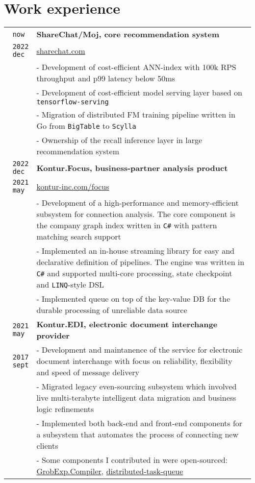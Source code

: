 \documentclass[10pt,a4paper]{article}
\begin{document}
\section{Work experience}
\vspace{1mm}
\begin{tabular}{r p{14cm}}
	\texttt{now{ }} & \textbf{ShareChat/Moj, core recommendation system}\\
	\texttt{2022 dec{ }} & \href{https://sharechat.com/}{sharechat.com}\\
	& \small{- Development of cost-efficient ANN-index with 100k RPS throughput and p99 latency below 50ms}\\
	& \small{- Development of cost-efficient model serving layer based on \texttt{tensorflow-serving}}\\
	& \small{- Migration of distributed FM training pipeline written in Go from \texttt{BigTable} to \texttt{Scylla}}\\
	& \small{- Ownership of the recall inference layer in large recommendation system}\\

	\texttt{2022 dec{ }} & \textbf{Kontur.Focus, business-partner analysis product}\\
	\texttt{2021 may{ }} & \href{https://kontur-inc.com/focus}{kontur-inc.com/focus}\\
	& \small{- Development of a high-performance and memory-efficient subsystem for connection analysis. The core component is the company graph index written in \texttt{C\#} with pattern matching search support}\\
	& \small{- Implemented an in-house streaming library for easy and declarative definition of pipelines. The engine was written in \texttt{C\#} and supported multi-core processing, state checkpoint and \texttt{LINQ}-style DSL}\\
	& \small{- Implemented queue on top of the key-value DB for the durable processing of unreliable data source}\\

    \texttt{2021 may{ }} & \textbf{Kontur.EDI, electronic document interchange provider} \\
    \texttt{2017 sept} & \small{- Development and maintanence of the service for electronic document interchange with focus on reliability, flexibility and speed of message delivery}\\
    & \small{- Migrated legacy even-sourcing subsystem which involved live multi-terabyte intelligent data migration and business logic refinements}\\
    & \small{- Implemented both back-end and front-end components for a subsystem that automates the process of connecting new clients}\\
    & \small{- Some components I contributed in were open-sourced: \href{https://github.com/skbkontur/GrobExp.Compiler}{GrobExp.Compiler}, \href{https://github.com/skbkontur/cassandra-distributed-task-queue}{distributed-task-queue}}\\
\end{tabular}
\end{document}
